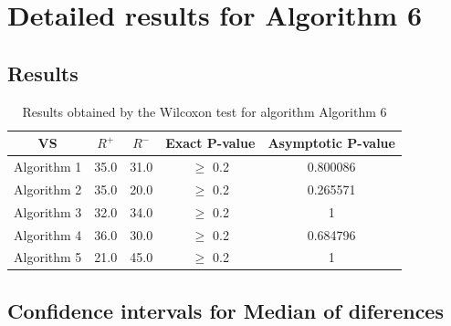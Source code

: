 \documentclass[a4paper,10pt]{article}
\begin{document}
 \clearpage 


\section{Detailed results for Algorithm 6}


\subsection{Results}

\begin{table}[!htp]
\centering\small
\begin{tabular}{
|c|c|c|c|c|}
\hline
 VS & $R^{+}$ & $R^{-}$ & Exact P-value & Asymptotic P-value \\ \hline 
Algorithm 1 & 35.0 & 31.0 & $\geq$ 0.2 & 0.800086\\ \hline 
Algorithm 2 & 35.0 & 20.0 & $\geq$ 0.2 & 0.265571\\ \hline 
Algorithm 3 & 32.0 & 34.0 & $\geq$ 0.2 & 1\\ \hline 
Algorithm 4 & 36.0 & 30.0 & $\geq$ 0.2 & 0.684796\\ \hline 
Algorithm 5 & 21.0 & 45.0 & $\geq$ 0.2 & 1\\ \hline 

\end{tabular}
\caption{Results obtained by the Wilcoxon test for algorithm Algorithm 6}
\end{table}

\subsection{Confidence intervals for Median of diferences}
\end{document}
